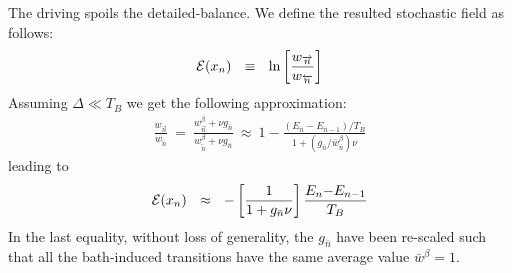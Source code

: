 \documentclass[aps,pre,floats,floatfix,twocolumn]{revtex4}
\newcommand{\mylabel}[1]{\label{#1}}
\newcommand{\beq}{\begin{eqnarray}}
\newcommand{\eeq}{\end{eqnarray}}
\newcommand{\be}[1]{\begin{eqnarray}\ifthenelse{#1=-1}
{\nonumber}{\ifthenelse{#1=0}{}{\mylabel{e#1}}}}
\begin{document}
The driving spoils the detailed-balance. 
We define the resulted stochastic field as follows:
%
\be{100} 
\mathcal{E}(x_n) \ \ \equiv \ \ \ln \left[\frac{w_{\overrightarrow{n}}}{w_{\overleftarrow{n}}}\right] 
\eeq
%
Assuming  ${\Delta \ll T_B}$ we get the following approximation: 
%
\beq
\frac{w_{\overrightarrow{n}}}{w_{\overleftarrow{n}}} 
\ = \ \frac{w^{\beta}_{\overrightarrow{n}}+\nu g_{\bar{n}}}{w^{\beta}_{\overleftarrow{n}}+\nu g_{\bar{n}}}
\ \approx \ 1- \frac{(E_n-E_{n{-}1})/T_B}{1+(g_{\bar{n}}/\bar{w}_{\bar{n}}^{\beta})\nu}
\eeq
%
leading to 
%
\be{101}
\mathcal{E}(x_n) \ \ \approx \ \ - \left[ \frac{1}{1+g_{\bar{n}}\nu} \right] \frac{E_n{-}E_{n{-}1}}{T_B}
\eeq
%
In the last equality, without loss of generality,  
the $g_{\bar{n}}$ have been re-scaled such that 
all the bath-induced transitions 
have the same average value ${\bar{w}^{\beta}=1}$.
\end{document}
